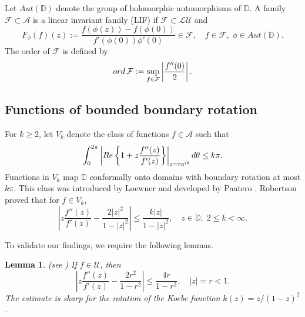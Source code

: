\documentclass[12pt,a4paper]{amsart}
\numberwithin{equation}{section}
\newtheorem{lemma}{Lemma}[section]
\theoremstyle{remark}
\begin{document}
Let $Aut(\mathbb{D})$ denote the group of holomorphic automorphisms of $\mathbb{D}$. A family $\mathcal{F} \subset \mathcal{A}$ is a linear invariant family (LIF) if $\mathcal{F} \subset \mathcal{LU}$ and
\[
F_\phi(f)(z) := \frac{f(\phi(z)) - f(\phi(0))}{f'(\phi(0)) \phi'(0)} \in \mathcal{F}, \quad f \in \mathcal{F}, \; \phi \in Aut(\mathbb{D}).
\]
The order of $\mathcal{F}$ is defined by
\[
{\rm ord}\,\mathcal{F} := \sup_{f \in \mathcal{F}} \left| \frac{f''(0)}{2} \right|.
\]

\subsection*{Functions of bounded boundary rotation}
For $k \ge 2$, let $V_k$ denote the class of functions $f \in \mathcal{A}$ such that
\[
\int_0^{2\pi} \left| {\rm Re} \left\{ 1 + z \frac{f''(z)}{f'(z)} \right\} \right|_{z=re^{i\theta}} d\theta \le k \pi.
\]
Functions in $V_k$ map $\mathbb{D}$ conformally onto domains with boundary rotation at most $k \pi$. This class was introduced by Loewner \cite{Low} and developed by Paatero \cite{Paa1}. Robertson \cite[Theorem 1]{Robertson1969} proved that for $f \in V_k$,
\begin{equation}\label{ineq Vk}
\left| z \frac{f''(z)}{f'(z)} - \frac{2|z|^2}{1-|z|^2} \right| \le \frac{k |z|}{1-|z|^2}, \quad z \in \mathbb{D}, \; 2 \le k < \infty.
\end{equation}


To validate our findings, we require the following lemmas. %



\begin{lemma}\label{lem estimate univalent functions}{\rm(}see \cite[p. 15]{Graham}{\rm)}
  If $f\in \mathcal{U}$, then
\begin{equation*}
  \left|z\frac{f''(z)}{f'(z)}-\frac{2r^2}{1-r^2}\right|\leq \frac{4r}{1-r^2},\quad|z|=r<1.
\end{equation*}
The estimate is sharp for the rotation of the Koebe function $k(z)=z/(1-z)^2$.
\end{lemma}
\end{document}

